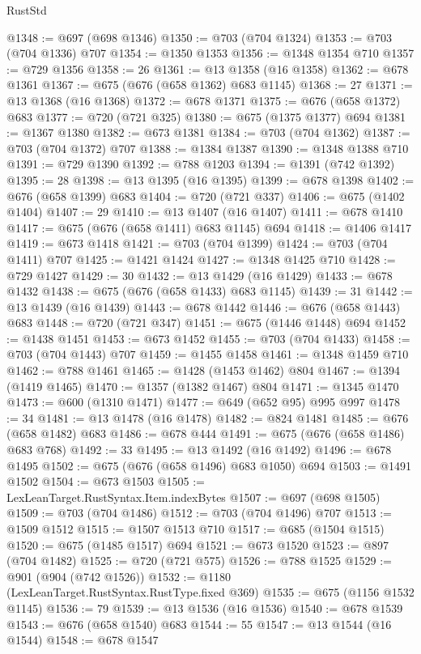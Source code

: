\begin{lexlean}{RustStd}
\begin{coremodule}
@1348 := @697 (@698 @1346)
@1350 := @703 (@704 @1324)
@1353 := @703 (@704 @1336) @707
@1354 := @1350 @1353
@1356 := @1348 @1354 @710
@1357 := @729 @1356
@1358 := 26
@1361 := @13 @1358 (@16 @1358)
@1362 := @678 @1361
@1367 := @675 (@676 (@658 @1362) @683 @1145)
@1368 := 27
@1371 := @13 @1368 (@16 @1368)
@1372 := @678 @1371
@1375 := @676 (@658 @1372) @683
@1377 := @720 (@721 @325)
@1380 := @675 (@1375 @1377) @694
@1381 := @1367 @1380
@1382 := @673 @1381
@1384 := @703 (@704 @1362)
@1387 := @703 (@704 @1372) @707
@1388 := @1384 @1387
@1390 := @1348 @1388 @710
@1391 := @729 @1390
@1392 := @788 @1203
@1394 := @1391 (@742 @1392)
@1395 := 28
@1398 := @13 @1395 (@16 @1395)
@1399 := @678 @1398
@1402 := @676 (@658 @1399) @683
@1404 := @720 (@721 @337)
@1406 := @675 (@1402 @1404)
@1407 := 29
@1410 := @13 @1407 (@16 @1407)
@1411 := @678 @1410
@1417 := @675 (@676 (@658 @1411) @683 @1145) @694
@1418 := @1406 @1417
@1419 := @673 @1418
@1421 := @703 (@704 @1399)
@1424 := @703 (@704 @1411) @707
@1425 := @1421 @1424
@1427 := @1348 @1425 @710
@1428 := @729 @1427
@1429 := 30
@1432 := @13 @1429 (@16 @1429)
@1433 := @678 @1432
@1438 := @675 (@676 (@658 @1433) @683 @1145)
@1439 := 31
@1442 := @13 @1439 (@16 @1439)
@1443 := @678 @1442
@1446 := @676 (@658 @1443) @683
@1448 := @720 (@721 @347)
@1451 := @675 (@1446 @1448) @694
@1452 := @1438 @1451
@1453 := @673 @1452
@1455 := @703 (@704 @1433)
@1458 := @703 (@704 @1443) @707
@1459 := @1455 @1458
@1461 := @1348 @1459 @710
@1462 := @788 @1461
@1465 := @1428 (@1453 @1462) @804
@1467 := @1394 (@1419 @1465)
@1470 := @1357 (@1382 @1467) @804
@1471 := @1345 @1470
@1473 := @600 (@1310 @1471)
@1477 := @649 (@652 @95) @995 @997
@1478 := 34
@1481 := @13 @1478 (@16 @1478)
@1482 := @824 @1481
@1485 := @676 (@658 @1482) @683
@1486 := @678 @444
@1491 := @675 (@676 (@658 @1486) @683 @768)
@1492 := 33
@1495 := @13 @1492 (@16 @1492)
@1496 := @678 @1495
@1502 := @675 (@676 (@658 @1496) @683 @1050) @694
@1503 := @1491 @1502
@1504 := @673 @1503
@1505 := LexLeanTarget.RustSyntax.Item.indexBytes
@1507 := @697 (@698 @1505)
@1509 := @703 (@704 @1486)
@1512 := @703 (@704 @1496) @707
@1513 := @1509 @1512
@1515 := @1507 @1513 @710
@1517 := @685 (@1504 @1515)
@1520 := @675 (@1485 @1517) @694
@1521 := @673 @1520
@1523 := @897 (@704 @1482)
@1525 := @720 (@721 @575)
@1526 := @788 @1525
@1529 := @901 (@904 (@742 @1526))
@1532 := @1180 (LexLeanTarget.RustSyntax.RustType.fixed @369)
@1535 := @675 (@1156 @1532 @1145)
@1536 := 79
@1539 := @13 @1536 (@16 @1536)
@1540 := @678 @1539
@1543 := @676 (@658 @1540) @683
@1544 := 55
@1547 := @13 @1544 (@16 @1544)
@1548 := @678 @1547

\end{coremodule}
\end{lexlean}
